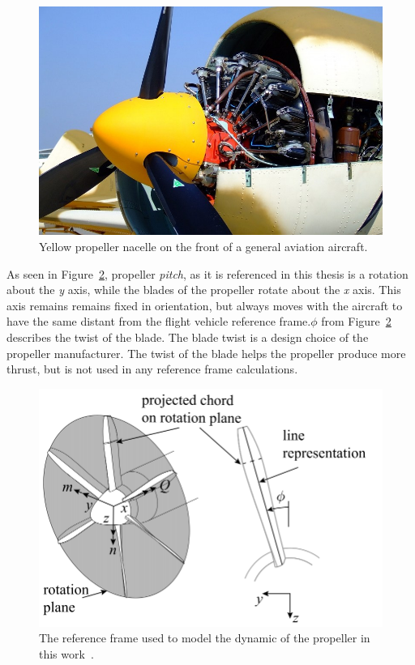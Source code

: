 \documentclass[12pt]{report}
\begin{document}
\begin{figure}[!ht]\label{fig:propnacelle}
  \centering
  \includegraphics[width=\linewidth]{Figures/propnacelle.jpg}
  \caption{Yellow propeller nacelle on the front of a general aviation aircraft.}
\end{figure}

As seen in Figure~\ref{fig:propframe}, propeller \textit{pitch}, as it is referenced in this thesis is a rotation about the \textit{y} axis, while the blades of the propeller rotate about the \textit{x} axis. This axis remains remains fixed in orientation, but always moves with the aircraft to have the same distant from the flight vehicle reference frame.\( \phi{}\) from Figure~\ref{fig:propframe} describes the twist of the blade. The blade twist is a design choice of the propeller manufacturer. The twist of the blade helps the propeller produce more thrust, but is not used in any reference frame calculations.

\begin{figure}[!ht]\label{fig:propframe}
  \centering
  \includegraphics[width=\linewidth]{Figures/propframe.png}
  \caption{The reference frame used to model the dynamic of the propeller in this work~\cite{vanarnhemEngineeringMethodEstimate2020}.}
\end{figure}
\end{document}
